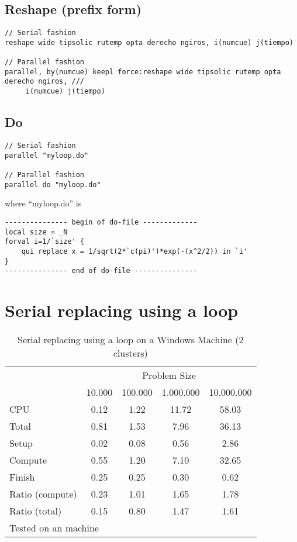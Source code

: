 \documentclass[letterpaper, 14pt, titlepage]{article}
\begin{document}
\begin{landscape}
\subsection{\LARGE Reshape (prefix form)}
\begin{Verbatim}[tabsize=4, fontsize=\large]
// Serial fashion
reshape wide tipsolic rutemp opta derecho ngiros, i(numcue) j(tiempo)

// Parallel fashion
parallel, by(numcue) keepl force:reshape wide tipsolic rutemp opta derecho ngiros, ///
	 i(numcue) j(tiempo)
\end{Verbatim}

\subsection{\LARGE Do}
\begin{Verbatim}[tabsize=4, fontsize=\large]
// Serial fashion
parallel "myloop.do"

// Parallel fashion
parallel do "myloop.do"
\end{Verbatim}

\noindent where ``myloop.do'' is
\begin{Verbatim}[tabsize=4, fontsize=\large]
--------------- begin of do-file -------------
local size = _N
forval i=1/`size' {
	qui replace x = 1/sqrt(2*`c(pi)')*exp(-(x^2/2)) in `i'
}
--------------- end of do-file ---------------
\end{Verbatim}

\pagebreak
\section{\Huge Serial replacing using a loop}

\begin{table}[!h]
\Large
\centering
\caption{\large Serial replacing using a loop on a Windows Machine (2 clusters)}
\begin{tabular}{l*{4}{c}}\hline
& \multicolumn{4}{c}{Problem Size} \\
& 10.000 &           100.000 &          1.000.000 &         10.000.000 \\ \hline
CPU &     0.12 &      1.22 &     11.72 &     58.03 \\
Total &     0.81 &      1.53 &      7.96 &     36.13 \\
\hspace{2mm} Setup &     0.02 &      0.08 &      0.56 &      2.86 \\
\hspace{2mm} Compute &     0.55 &      1.20 &      7.10 &     32.65 \\
\hspace{2mm} Finish &     0.25 &      0.25 &      0.30 &      0.62 \\
\hline Ratio (compute) &     0.23 &      1.01 &      1.65 &      1.78 \\
Ratio (total) &     0.15 &      0.80 &      1.47 &      1.61 \\
\hline
\multicolumn{4}{l}{\footnotesize Tested on an \win1 machine}
\end{tabular}
\end{table}


\end{landscape}
\end{document}
